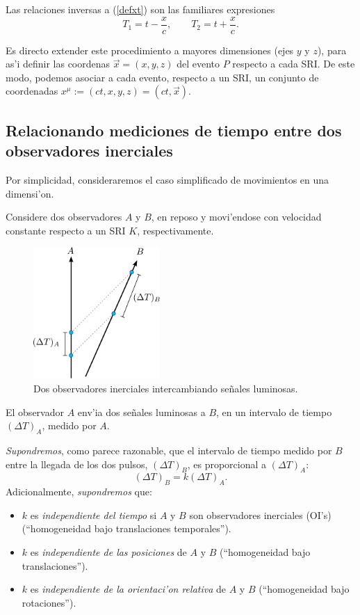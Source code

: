 Las relaciones inversas a (\ref{defxt}) son las familiares expresiones
\begin{equation}\label{T1T2xt}
T_1=t-\frac{x}{c}, \qquad T_2=t+\frac{x}{c}.
\end{equation}


Es directo extender este procedimiento a mayores dimensiones (ejes $y$ y $z$), para as'i definir las coordenas $\vec{x}=(x,y,z)$ del evento $P$ respecto a cada SRI.
De este modo, podemos asociar a cada evento, respecto a un SRI, un conjunto de
coordenadas $x^\mu:=\left(ct,x,y,z\right)=(ct,\vec{x}) $.


\subsection{Relacionando mediciones de tiempo entre dos observadores inerciales}

Por simplicidad, consideraremos el caso simplificado de movimientos en
una dimensi'on.

Considere dos observadores $A$ y $B$, en reposo y movi'endose con
velocidad constante respecto a un SRI $K$, respectivamente.
\begin{figure}[H]
\centerline{\includegraphics[height=5cm]{fig/fig-diagrama-factor-k.pdf}}
 \caption{Dos observadores inerciales intercambiando se\~nales luminosas.}
\label{k1}
\end{figure}
El observador $A$ env'ia dos se\~nales luminosas a $B$, en un intervalo de tiempo $(\Delta T)_A$, medido por $A$.

\textit{Supondremos}, como parece razonable, que el intervalo de tiempo medido por $B$ entre la llegada
de los dos pulsos, $(\Delta T)_B$, es proporcional a $(\Delta T)_A$:
\begin{equation}
(\Delta T)_B=k (\Delta T)_A. \label{TAkTB}
\end{equation}
Adicionalmente, \textit{supondremos} que:
\begin{itemize}
\item $k$ es \textit{independiente del tiempo} si $A$ y $B$ son observadores inerciales (OI's) (``homogeneidad bajo
translaciones temporales'').
\item $k$ es \textit{independiente de las posiciones} de $A$ y $B$ (``homogeneidad bajo translaciones'').
\item $k$ es \textit{independiente de la orientaci'on relativa} de $A$ y $B$ (``homogeneidad bajo rotaciones'').
\end{itemize}

